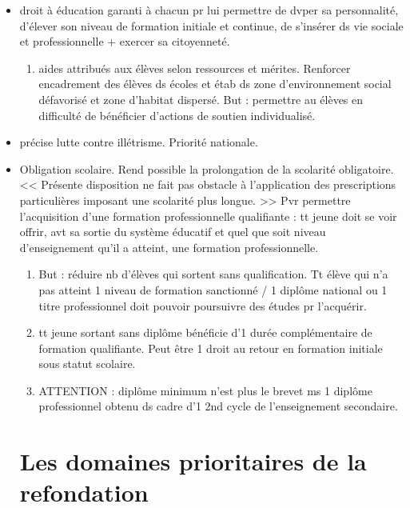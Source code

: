 \documentclass[12pt]{report}
\begin{document}
\begin{itemize}
\item droit à éducation garanti à chacun pr lui permettre de dvper sa personnalité, d'élever son niveau de formation initiale et continue, de s'insérer ds vie sociale et professionnelle + exercer sa citoyenneté. \\
\begin{enumerate}
\item aides attribués aux élèves selon ressources et mérites. Renforcer encadrement des élèves ds écoles et étab ds zone d'environnement social défavorisé et zone d'habitat dispersé. But : permettre au élèves en difficulté de bénéficier d'actions de soutien individualisé. \\
\end{enumerate}

\item précise lutte contre illétrisme. Priorité nationale. \\

\item Obligation scolaire. Rend possible la prolongation de la scolarité obligatoire. << Présente disposition ne fait pas obstacle à l'application des prescriptions particulières imposant une scolarité plus longue. >> Pvr permettre l'acquisition d'une formation professionnelle qualifiante : tt jeune doit se voir offrir, avt sa sortie du système éducatif et quel que soit niveau d'enseignement qu'il a atteint, une formation professionnelle. \\
\begin{enumerate}
\item But : réduire nb d'élèves qui sortent sans qualification. Tt élève qui n'a pas atteint 1 niveau de formation sanctionné / 1 diplôme national ou 1 titre professionnel doit pouvoir poursuivre des études pr l'acquérir.\\
\item tt jeune sortant sans diplôme bénéficie d'1 durée complémentaire de formation qualifiante. Peut être 1 droit au retour en formation initiale sous statut scolaire. \\
\item ATTENTION : diplôme minimum n'est plus le brevet ms 1 diplôme professionnel obtenu ds cadre d'1 2nd cycle de l'enseignement secondaire. \\
\end{enumerate}


\chapter{Les domaines prioritaires de la refondation}


\end{itemize}
\end{document}
